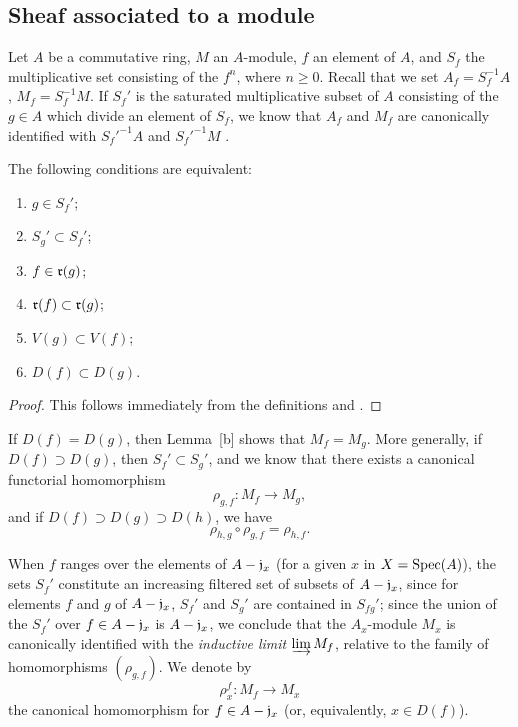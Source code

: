 \subsection{Sheaf associated to a module}
\label{subsection:assoc-sheaf}

\begin{env}[1.3.1]
\label{1.1.3.1}
Let $A$ be a commutative ring, $M$ an $A$-module, $f$ an element of $A$, and $S_f$ the multiplicative set consisting of the $f^n$, where $n\geq 0$.
Recall that we set $A_f=S_f^{-1}A$, $M_f=S_f^{-1}M$.
If $S_f'$ is the saturated multiplicative subset of $A$ consisting of the $g\in A$ which divide an element of $S_f$, we know that $A_f$ and $M_f$ are canonically identified with ${S_f'}^{-1}A$ and ${S_f'}^{-1}M$ .
\end{env}

\begin{lem}[1.3.2]
\label{1.1.3.2}
The following conditions are equivalent:
\begin{enumerate}[label=\emph{(\alph*)}]
    \item $g\in S_f'$;
    \item $S_g'\subset S_f'$;
    \item $f\in\mathfrak{r}(g)$;
    \item $\mathfrak{r}(f)\subset\mathfrak{r}(g)$;
    \item $V(g)\subset V(f)$;
    \item $D(f)\subset D(g)$.
\end{enumerate}
\end{lem}

\begin{proof}
\label{proof-1.1.3.2}
This follows immediately from the definitions and .
\end{proof}

\begin{env}[1.3.3]
\label{1.1.3.3}
If $D(f)=D(g)$, then Lemma~[b] shows that $M_f=M_g$.
More generally, if $D(f)\supset D(g)$, then $S_f'\subset S_g'$, and we know  that there exists a canonical functorial homomorphism
\[
  \rho_{g,f}:M_f\to M_g,
\]
and if $D(f)\supset D(g)\supset D(h)$, we have 
\[
  \rho_{h,g}\circ\rho_{g,f}=\rho_{h,f}.
  \tag{1.3.3.1}
\]
\end{env}

When $f$ ranges over the elements of $A-\mathfrak{j}_x$ (for a given $x$ in $X={\mathop{\mathrm{Spec}}\nolimits}(A)$), the sets $S_f'$ constitute an increasing filtered set of subsets of $A-\mathfrak{j}_x$, since for elements $f$ and $g$ of $A-\mathfrak{j}_x$, $S_f'$ and $S_g'$ are contained in $S_{fg}'$;
since the union of the $S_f'$ over $f\in A-\mathfrak{j}_x$ is $A-\mathfrak{j}_x$, we conclude  that the $A_x$-module $M_x$ is canonically identified with the \emph{inductive limit} $\varinjlim M_f$, relative to the family of homomorphisms $(\rho_{g,f})$.
We denote by
\[
  \rho_x^f:M_f\to M_x
\]
the canonical homomorphism for $f\in A-\mathfrak{j}_x$ (or, equivalently, $x\in D(f)$).

